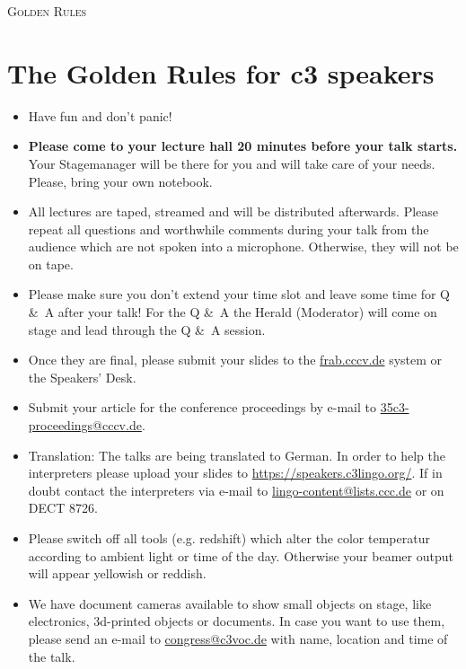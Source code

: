\documentclass[paper=a4]{scrartcl}
\begin{document}
	\begin{center} \textsc{\Huge Golden Rules}\end{center}
	\hfill
	\section*{The Golden Rules for c3 speakers}
	\begin{itemize}
		\item Have fun and don't panic!
		\item \textbf{Please come to your lecture hall 20 minutes before your talk starts.} Your
		Stagemanager will be there	for	you and will take care of your needs. Please, bring your own notebook.
		\item All lectures are taped, streamed and will be distributed afterwards. Please repeat all questions and worthwhile comments during your talk from the audience which are not spoken into a microphone. Otherwise, they will not be on tape.
		\item Please make sure you don't extend your time slot and
		leave some time for Q \&\ A after your talk! For the Q \&\ A  the Herald (Moderator) will come on stage and lead through the Q \&\ A session. 
		\item Once they are final, please submit your slides to the \url{frab.cccv.de} system or the Speakers' Desk.
		\item Submit your article for the conference proceedings by e-mail to \url{35c3-proceedings@cccv.de}.
		\item Translation: The talks are being translated to German. In order to help the interpreters please upload your slides to \url{https://speakers.c3lingo.org/}. If in doubt contact the interpreters via e-mail  to \url{lingo-content@lists.ccc.de} or on DECT 8726.
		\item Please switch off all tools (e.g. redshift) which alter the color temperatur according to ambient light or time of the day. Otherwise your beamer output will appear yellowish or reddish.
		\item We have document cameras available to show small objects on stage, like electronics, 3d-printed objects or documents. In case you want to use them, please send an e-mail to \url{congress@c3voc.de} with name, location and time of the talk.
	\end{itemize}
\end{document}
